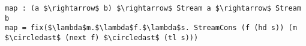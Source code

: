 \begin{lstlisting}[mathescape]
map : (a $\rightarrow$ b) $\rightarrow$ Stream a $\rightarrow$ Stream b
map = fix($\lambda$m.$\lambda$f.$\lambda$s. StreamCons (f (hd s)) (m $\circledast$ (next f) $\circledast$ (tl s)))
\end{lstlisting}
